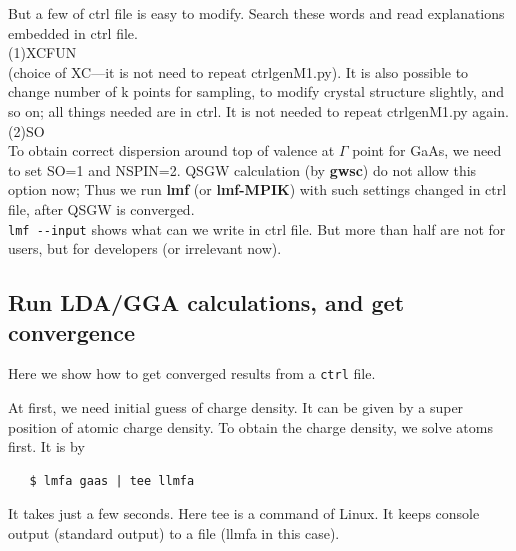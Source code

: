\documentclass[a4paper,10pt,epsf,fleqn]{article}
\newcommand{\exe}[1]{{\bf #1}\index{#1}}
\begin{document}
But a few of ctrl file is easy to modify. Search these words and read 
explanations embedded in ctrl file.\\
(1)XCFUN \\
(choice of XC---it is not need to repeat ctrlgenM1.py). 
It is also possible to change number of k points for sampling, to modify
crystal structure slightly, and so on; all things needed are in ctrl.
It is not needed to repeat ctrlgenM1.py again.\\
(2)SO \\
To obtain correct dispersion around top of valence at 
$\Gamma$ point for GaAs, we need to set SO=1 and NSPIN=2. 
QSGW calculation (by \exe{gwsc}) do not allow this option now;
Thus we run \exe{lmf} (or \exe{lmf-MPIK})
with such settings changed in ctrl file, after QSGW is converged.\\

\verb+lmf --input+ shows what can we write in ctrl file.
But more than half are not for users, but for developers 
(or irrelevant now).
 

\subsection{Run LDA/GGA calculations, and get convergence}
\label{lm7K-scf}
Here we show how to get converged results from a \verb+ctrl+ file.

At first, we need initial guess of charge density.
It can be given by a super position of atomic charge density.
To obtain the charge density, we solve atoms first. It is by
\begin{verbatim}
   $ lmfa gaas | tee llmfa
\end{verbatim}
It takes just a few seconds. Here tee is a command of Linux.
It keeps console output (standard output) to a file (llmfa in this case).
\end{document}
